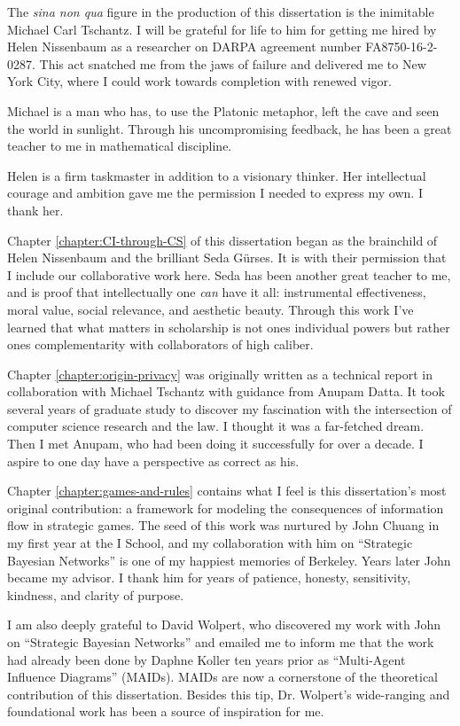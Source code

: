 \documentclass[../thesis.tex]{subfiles}
\begin{document}
 The \textit{sina non qua} figure in the production of
 this dissertation is the inimitable Michael Carl Tschantz.
 I will be grateful for life to him for getting me hired by
 Helen Nissenbaum as a researcher on DARPA agreement number FA8750-16-2-0287.
 This act snatched me from the jaws of failure and delivered me
 to New York City, where I could work towards completion with renewed vigor.

 Michael is a man who has, to use the Platonic metaphor,
 left the cave and seen the world in sunlight.
 Through his uncompromising feedback, he has been a
 great teacher to me in mathematical discipline.

 Helen is a firm taskmaster in addition to a visionary thinker.
 Her intellectual courage and ambition gave me the permission I needed to express my own.
 I thank her.
 
 Chapter \ref{chapter:CI-through-CS} of this dissertation began as the brainchild
 of Helen Nissenbaum and the brilliant Seda G{\"u}rses.
 It is with their permission that I include our collaborative work here.
 Seda has been another great teacher to me,
 and is proof that intellectually
 one \textit{can} have it all:
 instrumental effectiveness, moral value, social relevance,
 and aesthetic beauty.
 Through this work I've learned that what matters in
 scholarship is not ones individual powers but rather
 ones complementarity with collaborators of high caliber.

 Chapter \ref{chapter:origin-privacy} was originally written
 as a technical report in collaboration with Michael Tschantz
 with guidance from Anupam Datta.
 It took several years of graduate study to discover my
 fascination with the intersection of computer science
 research and the law.
 I thought it was a far-fetched dream.
 Then I met Anupam,
 who had been doing it successfully for over a decade.
 I aspire to one day have a perspective as correct as his.

 Chapter \ref{chapter:games-and-rules} contains what I feel
 is this dissertation's most original contribution:
 a framework for modeling the consequences of information flow
 in strategic games.
 The seed of this work was nurtured by John Chuang
 in my first year at the I School, and my collaboration
 with him on ``Strategic Bayesian Networks'' is one of
 my happiest memories of Berkeley.
 Years later John became my advisor.
 I thank him for years of patience, honesty, sensitivity,
 kindness, and clarity of purpose.

 I am also deeply grateful to David Wolpert, who discovered
 my work with John on ``Strategic Bayesian Networks''
 and emailed me to inform me that the work had already
 been done by Daphne Koller ten years prior as
 ``Multi-Agent Influence Diagrams'' (MAIDs).
  MAIDs are now a cornerstone of the theoretical contribution
 of this dissertation.
 Besides this tip, Dr. Wolpert's wide-ranging and foundational
 work has been a source of inspiration for me.
 
\end{document}
